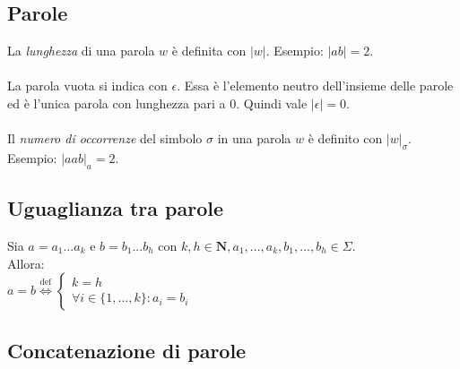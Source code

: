 \documentclass[]{article}
\begin{document}
\subsection{Parole}

La \textit{lunghezza} di una parola \mbox{$w$} è definita con \mbox{$|w|$}.
Esempio: \mbox{$|ab| = 2$}.
\\
\\
La parola vuota si indica con \mbox{$\epsilon$}. Essa è l'elemento neutro dell'insieme delle parole ed è l'unica
parola con lunghezza pari a \mbox{$0$}. Quindi vale \mbox{$|\epsilon|=0$}.
\\
\\
Il \textit{numero di occorrenze} del simbolo \mbox{$\sigma$} in una parola \mbox{$w$} è definito con \mbox{$|w|_\sigma$}. Esempio: \mbox{$|aab|_a=2$}.


\subsection{Uguaglianza tra parole}

Sia
\begin{math}
a = a_1...a_k
\end{math}
e
\begin{math}
b = b_1...b_h
\end{math}
con
\begin{math}
k, h \in \mathbf{N},
a_1, ..., a_k, b_1, ..., b_h \in \Sigma
\end{math}.
\\
Allora:
\\
\begin{math}
a=b
\overset{\text{def}}{\Leftrightarrow}
\begin{cases}
k = h \\
\forall i \in \{1, ..., k\} : a_i=b_i
\end{cases}
\end{math}

\newpage
\subsection{Concatenazione di parole}
\end{document}
